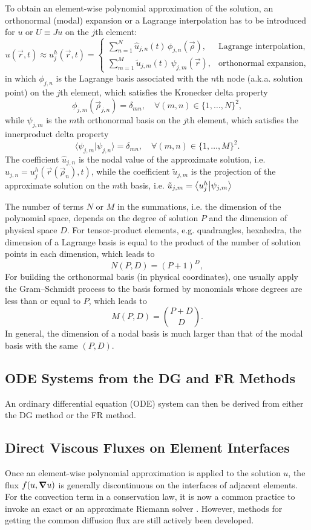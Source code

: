 \documentclass[10pt,draft]{article}
\begin{document}
To obtain an element-wise polynomial approximation of the solution, an orthonormal (modal) expansion or a Lagrange interpolation has to be introduced for $u$ or $U\equiv Ju$ on the $j$th element:
$$
u(\vec{r},t)\approx u_{j}^{h}(\vec{r},t)=\begin{cases}
\sum_{n=1}^{N}\hat{u}_{j,n}(t)\,\phi_{j,n}(\vec{\rho}), & \text{Lagrange interpolation},\\
\sum_{m=1}^{M}\tilde{u}_{j,m}(t)\,\psi_{j,m}(\vec{r}), & \text{orthonormal expansion},
\end{cases}
$$
in which $\phi_{j,n}$ is the Lagrange basis associated with the $n$th node (a.k.a. solution point) on the $j$th element, which satisfies the Kronecker delta property
$$
\phi_{j,m}(\vec{\rho}_{j,n})=\delta_{mn},\quad\forall (m,n)\in\{1,\dots,N\}^2,
$$
while $\psi_{j,m}$ is the $m$th orthonormal basis on the $j$th element, which satisfies the innerproduct delta property
$$
\langle\psi_{j,m}\vert\psi_{j,n}\rangle=\delta_{mn},\quad\forall (m,n)\in\{1,\dots,M\}^2.
$$
%
The coefficient $\hat{u}_{j,n}$ is the nodal value of the approximate solution, i.e. $\hat{u}_{j,n}=u_j^h(\vec{r}(\vec{\rho}_n), t)$,
while the coefficient $\tilde{u}_{j,m}$ is the projection of the approximate solution on the $m$th basis, i.e. $\tilde{u}_{j,m}=\ip{u_j^h}{\psi_{j,m}}$

The number of terms $N$ or $M$ in the summations, i.e. the dimension of the polynomial space, depends on the degree of solution $P$ and the dimension of physical space $D$.
%
For tensor-product elements, e.g. quadrangles, hexahedra, the dimension of a Lagrange basis is equal to the product of the number of solution points in each dimension, which leads to
$$
N(P,D)=(P+1)^D,
$$
%
For building the orthonormal basis (in physical coordinates), one usually apply the Gram--Schmidt process to the basis formed by monomials whose degrees are less than or equal to $P$, which leads to
$$
M(P,D)=\binom{P+D}{D}.
$$
%
In general, the dimension of a nodal basis is much larger than that of the modal basis with the same $(P,D)$.

\subsection{ODE Systems from the DG and FR Methods}
An ordinary differential equation (ODE) system can then be derived from either the DG method or the FR method.

\subsection{Direct Viscous Fluxes on Element Interfaces}
Once an element-wise polynomial approximation is applied to the solution $u$, the flux $f(u,\grad u)$ is generally discontinuous on the interfaces of adjacent elements.
%
For the convection term in a conservation law, it is now a common practice to invoke an exact or an approximate Riemann solver \cite{Toro_2009}.
However, methods for getting the common diffusion flux are still actively been developed.
\end{document}
